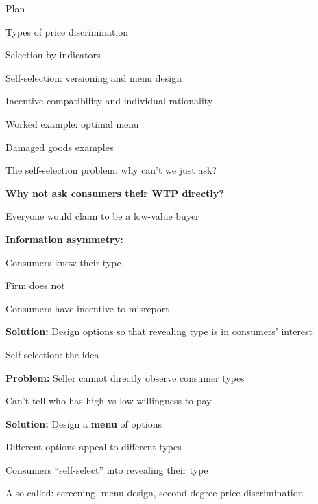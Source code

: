 \documentclass[notes,11pt, aspectratio=169]{beamer}
\newenvironment{wideitemize}{\itemize\addtolength{\itemsep}{10pt}}{\enditemize}
\newenvironment{wideenumerate}{\enumerate\addtolength{\itemsep}{10pt}}{\endenumerate}
\begin{document}

\begin{frame}{Plan}
  \begin{wideenumerate}
    \item Types of price discrimination
    \item Selection by indicators
    \item Self-selection: versioning and menu design
    \item Incentive compatibility and individual rationality
    \item Worked example: optimal menu
    \item Damaged goods examples
  \end{wideenumerate}
\end{frame}

\begin{frame}{The self-selection problem: why can't we just ask?}
	\begin{wideitemize}
		\item \textbf{Why not ask consumers their WTP directly?}
		\item Everyone would claim to be a low-value buyer
		\item \textbf{Information asymmetry:}
		\begin{wideitemize}
			\vspace{5pt}
			\item Consumers know their type
			\item Firm does not
			\item Consumers have incentive to misreport
		\end{wideitemize}
		\item \textbf{Solution:} Design options so that revealing type is in consumers' interest
	\end{wideitemize}
\end{frame}

\begin{frame}{Self-selection: the idea}
	\begin{wideitemize}
		\item \textbf{Problem:} Seller cannot directly observe consumer types
		\begin{wideitemize}
			\vspace{5pt}
			\item Can't tell who has high vs low willingness to pay
		\end{wideitemize}
		\item \textbf{Solution:} Design a \textbf{menu} of options
		\begin{wideitemize}
			\vspace{5pt}
			\item Different options appeal to different types
			\item Consumers ``self-select'' into revealing their type
		\end{wideitemize}
		\item Also called: screening, menu design, second-degree price discrimination
	\end{wideitemize}
\end{frame}
\end{document}
